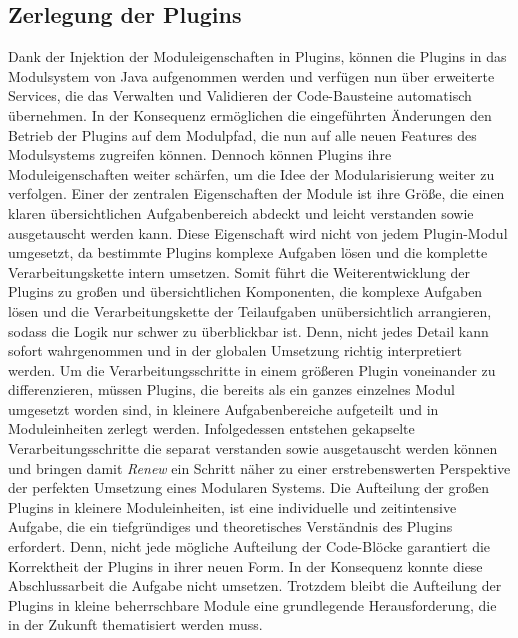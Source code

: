  \subsection{Zerlegung der Plugins}
	Dank der Injektion der Moduleigenschaften in Plugins, können die Plugins in das Modulsystem von Java aufgenommen werden und verfügen nun über erweiterte Services, die das Verwalten und Validieren der Code-Bausteine automatisch übernehmen. In der Konsequenz ermöglichen die eingeführten Änderungen den Betrieb der Plugins auf dem Modulpfad, die nun auf alle neuen Features des Modulsystems zugreifen können. Dennoch können Plugins ihre Moduleigenschaften weiter schärfen, um die Idee der Modularisierung weiter zu verfolgen. \newline
	Einer der zentralen Eigenschaften der Module ist ihre Größe, die einen klaren übersichtlichen Aufgabenbereich abdeckt und leicht verstanden sowie ausgetauscht werden kann. Diese Eigenschaft wird nicht von jedem Plugin-Modul umgesetzt, da bestimmte Plugins komplexe Aufgaben lösen und die komplette Verarbeitungskette intern umsetzen. Somit führt die Weiterentwicklung der Plugins zu großen und übersichtlichen Komponenten, die komplexe Aufgaben lösen und die Verarbeitungskette der Teilaufgaben unübersichtlich arrangieren, sodass die Logik nur schwer zu überblickbar ist. Denn, nicht jedes Detail kann sofort wahrgenommen und in der globalen Umsetzung richtig interpretiert werden.\newline
	Um die Verarbeitungsschritte in einem größeren Plugin voneinander zu differenzieren, müssen Plugins, die bereits als ein ganzes einzelnes Modul umgesetzt worden sind, in kleinere Aufgabenbereiche aufgeteilt und in Moduleinheiten zerlegt werden. Infolgedessen entstehen gekapselte Verarbeitungsschritte die separat verstanden sowie ausgetauscht werden können und bringen damit  \textit{Renew} ein Schritt näher zu einer erstrebenswerten Perspektive der perfekten Umsetzung eines Modularen Systems. \newline
	Die Aufteilung der großen Plugins in kleinere Moduleinheiten, ist eine individuelle und zeitintensive Aufgabe, die ein tiefgründiges und theoretisches Verständnis des Plugins erfordert. Denn, nicht jede mögliche Aufteilung der Code-Blöcke garantiert die Korrektheit der Plugins in ihrer neuen Form. \newline
	In der Konsequenz konnte diese Abschlussarbeit die Aufgabe nicht umsetzen. Trotzdem bleibt die Aufteilung der Plugins in kleine beherrschbare Module eine grundlegende Herausforderung, die in der Zukunft thematisiert werden muss. 

